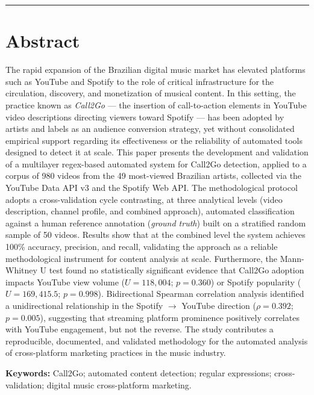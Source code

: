 \documentclass[12pt, a4paper]{article}
\begin{document}
\vspace{0.6cm}
\hrule
\vspace{0.5cm}

\section*{Abstract}

The rapid expansion of the Brazilian digital music market has elevated platforms such as YouTube and Spotify to the role of critical infrastructure for the circulation, discovery, and monetization of musical content. In this setting, the practice known as \textit{Call2Go} --- the insertion of call-to-action elements in YouTube video descriptions directing viewers toward Spotify --- has been adopted by artists and labels as an audience conversion strategy, yet without consolidated empirical support regarding its effectiveness or the reliability of automated tools designed to detect it at scale. This paper presents the development and validation of a multilayer regex-based automated system for Call2Go detection, applied to a corpus of 980 videos from the 49 most-viewed Brazilian artists, collected via the YouTube Data API v3 and the Spotify Web API. The methodological protocol adopts a cross-validation cycle contrasting, at three analytical levels (video description, channel profile, and combined approach), automated classification against a human reference annotation (\textit{ground truth}) built on a stratified random sample of 50 videos. Results show that at the combined level the system achieves 100\% accuracy, precision, and recall, validating the approach as a reliable methodological instrument for content analysis at scale. Furthermore, the Mann-Whitney U test found no statistically significant evidence that Call2Go adoption impacts YouTube view volume ($U = 118{,}004$; $p = 0.360$) or Spotify popularity ($U = 169{,}415.5$; $p = 0.998$). Bidirectional Spearman correlation analysis identified a unidirectional relationship in the Spotify $\to$ YouTube direction ($\rho = 0.392$; $p = 0.005$), suggesting that streaming platform prominence positively correlates with YouTube engagement, but not the reverse. The study contributes a reproducible, documented, and validated methodology for the automated analysis of cross-platform marketing practices in the music industry.

\noindent\textbf{Keywords:} Call2Go; automated content detection; regular expressions; cross-validation; digital music cross-platform marketing.
\end{document}
